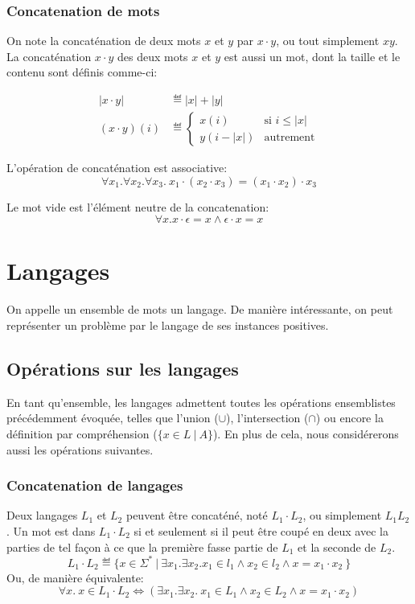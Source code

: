 \subsubsection{Concatenation de mots}

On note la concaténation de deux mots $x$ et $y$ par $x \cdot y$, ou tout simplement $xy$.
La concaténation $x \cdot y$ des deux mots $x$ et $y$ est aussi un mot, dont la taille et le contenu sont définis comme-ci:

\begin{align*}
|x \cdot y| &\eqdef |x| + |y|\\
(x \cdot y)(i) &\eqdef \begin{cases}
x(i) & \text{si $i \leq |x|$}\\
y(i - |x|) & \text{autrement}
\end{cases}
\end{align*}

L'opération de concaténation est associative:
\[
\forall x_1. \forall x_2. \forall x_3.\ x_1 \cdot (x_2 \cdot x_3) = (x_1 \cdot x_2) \cdot x_3   
\]

Le mot vide est l'élément neutre de la concatenation:
\[
\forall x. x \cdot \epsilon = x \wedge \epsilon \cdot x = x
\]

\section{Langages}

On appelle un ensemble de mots un langage.
De manière intéressante, on peut représenter un problème par le langage de ses instances positives.

\subsection{Opérations sur les langages}

En tant qu'ensemble, les langages admettent toutes les opérations ensemblistes précédemment évoquée, telles que l'union ($\cup$), l'intersection ($\cap$) ou encore la définition par compréhension ($\{ x \in L\ |\ A \}$).
En plus de cela, nous considérerons aussi les opérations suivantes.

\subsubsection{Concatenation de langages}

Deux langages $L_1$ et $L_2$ peuvent être concaténé, noté $L_1 \cdot L_2$, ou simplement $L_1L_2$.
Un mot est dans $L_1 \cdot L_2$ si et seulement si il peut être coupé en deux avec la parties de tel façon à ce que la première fasse partie de $L_1$ et la seconde de $L_2$.
\[
L_1 \cdot L_2 \eqdef \{ x \in \Sigma^*\ |\ \exists x_1. \exists x_2. x_1 \in l_1 \wedge x_2 \in l_2 \wedge x = x_1 \cdot x_2\ \}
\]
Ou, de manière équivalente:
\[
\forall x.\ x \in L_1 \cdot L_2 \iff (\exists x_1. \exists x_2.\ x_1 \in L_1 \wedge x_2 \in L_2 \wedge x = x_1 \cdot x_2)
\]

